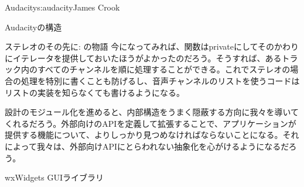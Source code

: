 \begin{aosachapter}{Audacity}{s:audacity}{James Crook}
\begin{aosasect1}{Audacityの構造}
\begin{aosabox}{ステレオのその先に: の物語}
今になってみれば、関数はprivateにしてそのかわりにイテレータを提供しておいたほうがよかったのだろう。そうすれば、あるトラック内のすべてのチャンネルを順に処理することができる。これでステレオの場合の処理を特別に書くことも防げるし、音声チャンネルのリストを使うコードはリストの実装を知らなくても書けるようになる。

\end{aosabox}

設計のモジュール化を進めると、内部構造をうまく隠蔽する方向に我々を導いてくれるだろう。外部向けのAPIを定義して拡張することで、アプリケーションが提供する機能について、よりしっかり見つめなければならないことになる。それによって我々は、外部向けAPIにとらわれない抽象化を心がけるようになるだろう。

\end{aosasect1}

\begin{aosasect1}{wxWidgets GUIライブラリ}


\end{aosasect1}
\end{aosachapter}
